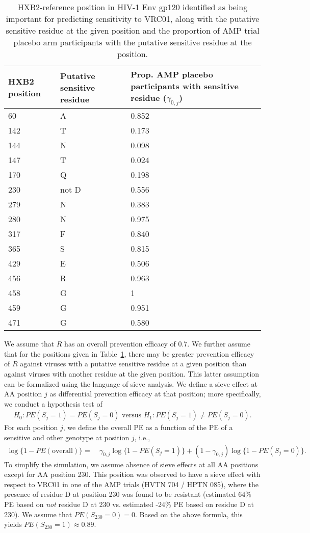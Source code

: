 \documentclass[10pt]{article}
\begin{document}
\begin{table}
  \caption{HXB2-reference position in HIV-1 Env gp120 identified as being important for predicting sensitivity to VRC01, along with the putative sensitive residue at the given position and the proportion of AMP trial placebo arm participants with the putative sensitive residue at the position.}
  \label{tab:sens}
  \begin{tabular}{lll}
    HXB2 position & Putative sensitive residue & Prop. AMP placebo participants with sensitive residue ($\gamma_{0,j}$)\\
    \hline
    60 & A & 0.852 \\
    142 & T & 0.173 \\
    144 & N & 0.098 \\
    147 & T & 0.024 \\
    170 & Q & 0.198 \\
    230 & not D & 0.556 \\
    279 & N & 0.383 \\
    280 & N & 0.975 \\
    317 & F & 0.840 \\
    365 & S & 0.815 \\
    429 & E & 0.506 \\
    456 & R & 0.963 \\
    458 & G & 1 \\
    459 & G & 0.951 \\
    471 & G & 0.580 \\
  \end{tabular}
\end{table}

We assume that $R$ has an overall prevention efficacy of 0.7. We further assume that for the positions given in Table~\ref{tab:sens}, there may be greater prevention efficacy of $R$ against viruses with a putative sensitive residue at a given position than against viruses with another residue at the given position. This latter assumption can be formalized using the language of sieve analysis. We define a sieve effect at AA position $j$ as differential prevention efficacy at that position; more specifically, we conduct a hypothesis test of
\begin{align*}
  H_0: PE(S_j = 1) = PE(S_j = 0) \text{ versus } H_1: PE(S_j = 1) \neq PE(S_j = 0).
\end{align*}
For each position $j$, we define the overall PE as a function of the PE of a sensitive and other genotype at position $j$, i.e.,
\begin{align*}
  \log \{1 - PE(\text{overall})\} =& \ \gamma_{0,j} \log \{1 - PE(S_j = 1)\} + (1 - \gamma_{0,j}) \log \{1 - PE(S_j = 0)\}.
\end{align*}
To simplify the simulation, we assume absence of sieve effects at all AA positions except for AA position 230. This position was observed to have a sieve effect with respect to VRC01 in one of the AMP trials (HVTN 704 / HPTN 085), where the presence of residue D at position 230 was found to be resistant (estimated 64\% PE based on \emph{not} residue D at 230 vs. estimated -24\% PE based on residue D at 230). We assume that $PE(S_{230} = 0) = 0$. Based on the above formula, this yields $PE(S_{230} = 1) \approx 0.89$.
\end{document}
